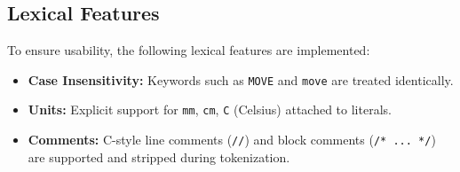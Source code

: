 \subsection{Lexical Features}
To ensure usability, the following lexical features are implemented:
\begin{itemize}
    \item \textbf{Case Insensitivity:} Keywords such as \texttt{MOVE} and \texttt{move} are treated identically.
    \item \textbf{Units:} Explicit support for \texttt{mm}, \texttt{cm}, \texttt{C} (Celsius) attached to literals.
    \item \textbf{Comments:} C-style line comments (\texttt{//}) and block comments (\texttt{/* ... */}) are supported and stripped during tokenization.
\end{itemize}
